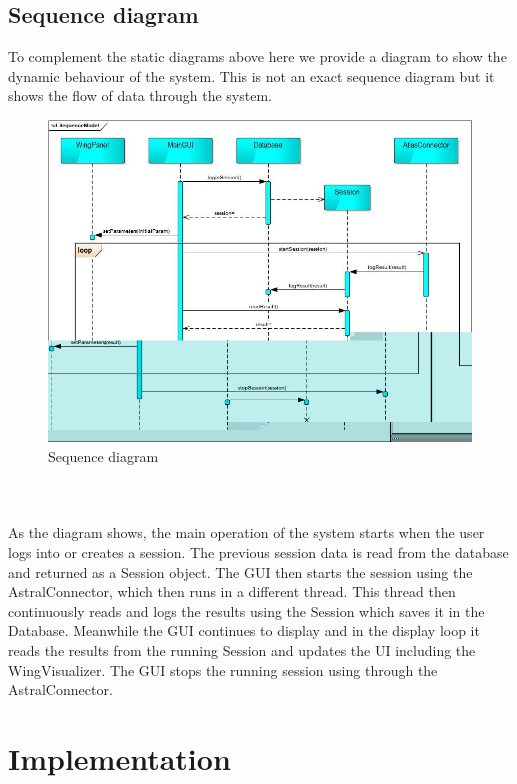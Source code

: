\documentclass[10pt,a4paper]{report}
\begin{document}
\section{Sequence diagram}
To complement the static diagrams above here we provide a diagram to show the dynamic behaviour of the system. This is not an exact sequence diagram but it shows the flow of data through the system.\\
\begin{figure}[h!]
\includegraphics[width=\textwidth]{SequenceModel.jpg}
\caption{Sequence diagram}
\end{figure}\\
\paragraph*{}
As the diagram shows, the main operation of the system starts when the user logs into or creates a session. The previous session data is read from the database and returned as a Session object. The GUI then starts the session using the AstralConnector, which then runs in a different thread. This thread then continuously reads and logs the results using the Session which saves it in the Database. Meanwhile the GUI continues to display and in the display loop it reads the results from the running Session and updates the UI including the WingVisualizer. The GUI stops the running session using through the AstralConnector.

\chapter{Implementation}
\end{document}
